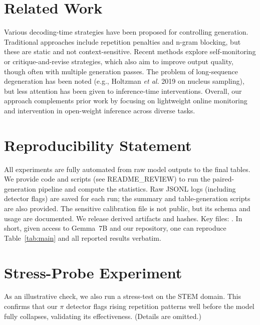 \documentclass{article}
\begin{document}
\section{Related Work}
Various decoding-time strategies have been proposed for controlling generation. Traditional approaches include repetition penalties and n-gram blocking, but these are static and not context-sensitive. Recent methods explore self-monitoring or critique-and-revise strategies, which also aim to improve output quality, though often with multiple generation passes. The problem of long-sequence degeneration has been noted (e.g., Holtzman \textit{et al.} 2019 on nucleus sampling), but less attention has been given to inference-time interventions. Overall, our approach complements prior work by focusing on lightweight online monitoring and intervention in open-weight inference across diverse tasks.

\section{Reproducibility Statement}
All experiments are fully automated from raw model outputs to the final tables. We provide code and scripts (see README\_REVIEW) to run the paired-generation pipeline and compute the statistics. Raw JSONL logs (including detector flags) are saved for each run; the summary and table-generation scripts are also provided. The sensitive calibration file is not public, but its schema and usage are documented. We release derived artifacts and hashes. Key files:
\newline
{}\newline
{}.
In short, given access to Gemma~7B and our repository, one can reproduce Table~\ref{tab:main} and all reported results verbatim.

\appendix

\section{Stress-Probe Experiment}
As an illustrative check, we also run a stress-test on the STEM domain. This confirms that our $\pi$ detector flags rising repetition patterns well before the model fully collapses, validating its effectiveness. (Details are omitted.)
\end{document}
